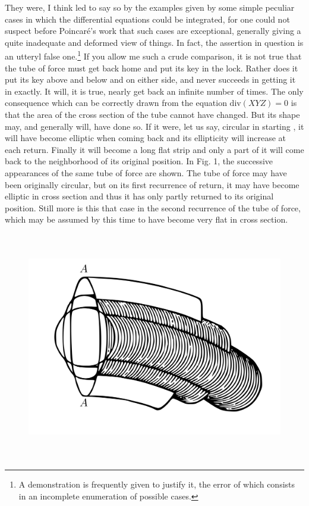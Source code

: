\documentclass[12pt,oneside]{book}
\begin{document}
They were, I think led to say so by the examples given by some simple peculiar cases in which the differential equations could be integrated, for one could not suspect before Poincar\'e's work that such cases are exceptional, generally giving a quite inadequate and deformed view of things. In fact, the assertion in question is an utteryl false one.\footnote{A demonstration is frequently given to justify it, the error of which consists in an incomplete enumeration of possible cases.} If you allow me such a crude comparison, it is not true that the tube of force must get back home and put its key in the lock. Rather does it put its key above and below and on either side, and never succeeds in getting it in exactly. It will, it is true, nearly get back an infinite number of times. The only consequence which can be correctly drawn from the equation $\text{div}(XYZ)=0$ is that the area of the cross section of the tube cannot have changed. But its shape may, and generally will, have done so. If it were, let us say, circular in starting , it will have become elliptic when coming back and its ellipticity will increase at each return. Finally it will become a long flat strip and only a part of it will come back to the neighborhood of its original position. In Fig. 1, the successive appearances of the same tube of force are shown. The tube of force may have been originally circular, but on its first recurrence of return, it may have become elliptic in cross section and thus it has only partly returned to its original position. Still more is this that case in the second recurrence of the tube of force, which may be assumed by this time to have become very flat in cross section.

\begin{figure}
    \centering
    \includegraphics[height=10cm]{Fig1.jpeg}
    \caption{}
    \label{Fig1}
\end{figure}
\end{document}
